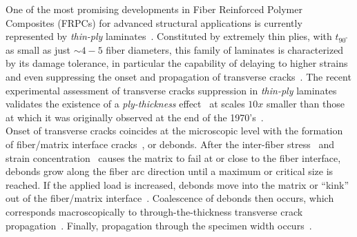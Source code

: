 \documentclass[a4paper,fleqn]{cas-dc}
\begin{document}
One of the most promising developments in Fiber Reinforced Polymer Composites (FRPCs) for advanced structural applications is currently represented by \emph{thin-ply} laminates~\cite{Kopp2017}. Constituted by extremely thin plies, with $t_{90^{\circ}}$ as small as just $\sim4-5$ fiber diameters, this family of laminates is characterized by its damage tolerance, in particular the capability of delaying to higher strains and even suppressing the onset and propagation of transverse cracks~\cite{Cugnoni2018}. The recent experimental assessment of transverse cracks suppression in \emph{thin-ply} laminates~\cite{Sasayama2003,Saito2012,Amacher2014} validates the existence of a \emph{ply-thickness} effect~\cite{Amacher2014} at scales $10x$ smaller than those at which it was originally observed at the end of the 1970's~\cite{Bailey1979}.\\
Onset of transverse cracks coincides at the microscopic level with the formation of fiber/matrix interface cracks~\cite{Bailey1981}, or debonds. After the inter-fiber stress~\cite{Asp1996} and strain concentration~\cite{Kies1962} causes the matrix to fail at or close to the fiber interface, debonds grow along the fiber arc direction until a maximum or critical size is reached. If the applied load is increased, debonds move into the matrix or ``kink'' out of the fiber/matrix interface~\cite{Zhang1997,Paris2007}. Coalescence of debonds then occurs, which corresponds macroscopically to through-the-thickness transverse crack propagation~\cite{Zhang1997,Zhuang2018b}. Finally, propagation through the specimen width occurs~\cite{Zhang1997}.\\
\end{document}
